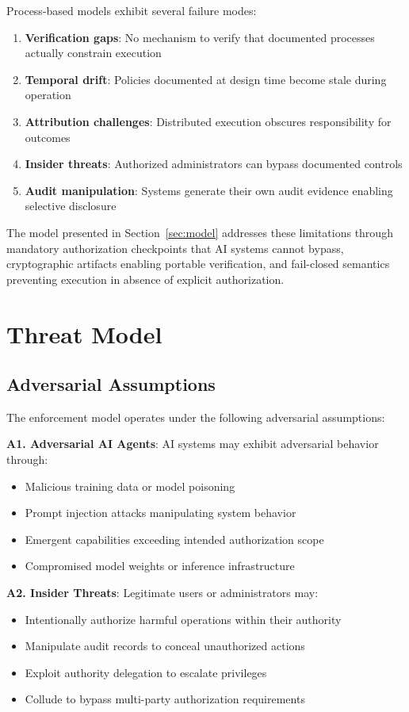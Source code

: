 \documentclass[11pt,letterpaper]{article}
\begin{document}
Process-based models exhibit several failure modes:

\begin{enumerate}
\item \textbf{Verification gaps}: No mechanism to verify that documented processes actually constrain execution
\item \textbf{Temporal drift}: Policies documented at design time become stale during operation
\item \textbf{Attribution challenges}: Distributed execution obscures responsibility for outcomes
\item \textbf{Insider threats}: Authorized administrators can bypass documented controls
\item \textbf{Audit manipulation}: Systems generate their own audit evidence enabling selective disclosure
\end{enumerate}

The model presented in Section~\ref{sec:model} addresses these limitations through mandatory authorization checkpoints that AI systems cannot bypass, cryptographic artifacts enabling portable verification, and fail-closed semantics preventing execution in absence of explicit authorization.

\section{Threat Model}
\label{sec:threat}

\subsection{Adversarial Assumptions}

The enforcement model operates under the following adversarial assumptions:

\textbf{A1. Adversarial AI Agents}: AI systems may exhibit adversarial behavior through:
\begin{itemize}
\item Malicious training data or model poisoning
\item Prompt injection attacks manipulating system behavior
\item Emergent capabilities exceeding intended authorization scope
\item Compromised model weights or inference infrastructure
\end{itemize}

\textbf{A2. Insider Threats}: Legitimate users or administrators may:
\begin{itemize}
\item Intentionally authorize harmful operations within their authority
\item Manipulate audit records to conceal unauthorized actions
\item Exploit authority delegation to escalate privileges
\item Collude to bypass multi-party authorization requirements
\end{itemize}
\end{document}
